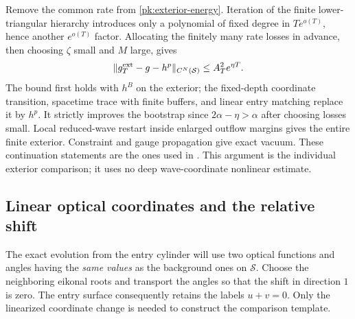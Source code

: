 Remove the common rate from \eqref{pk:exterior-energy}.
Iteration of the finite lower-triangular hierarchy introduces only
a polynomial of fixed degree in $Te^{o(T)}$, hence another
$e^{o(T)}$ factor. Allocating the finitely many rate losses in
advance, then choosing $\zeta$ small and $M$ large, gives
\begin{equation}\label{pk:wave-entry}
 \|g_T^{\rm ext}-g-h^p\|_{C^N(\mathcal S)}
                         \le A_T^2e^{\eta T}.
\end{equation}
The bound first holds with $h^B$ on the exterior; the fixed-depth
coordinate transition, spacetime trace with finite buffers, and
linear entry matching replace it by $h^p$. It strictly improves
the bootstrap since $2\alpha-\eta>\alpha$ after choosing losses
small. Local reduced-wave restart inside enlarged outflow margins
gives the entire finite exterior. Constraint and gauge propagation
give exact vacuum. These continuation statements are the ones
used in \cite[, , ]{KerrCTwo}.
This argument is the individual exterior comparison; it uses no
deep wave-coordinate nonlinear estimate.

\subsection{Linear optical coordinates and the relative shift}

The exact evolution from the entry cylinder will use two optical
functions and angles having the \emph{same values} as the background
ones on $\mathcal S$. Choose the neighboring eikonal roots and
transport the angles so that the shift in direction $1$ is zero.
The entry surface consequently retains the labels $u+v=0$.
Only the linearized coordinate change is needed to construct the
comparison template.

